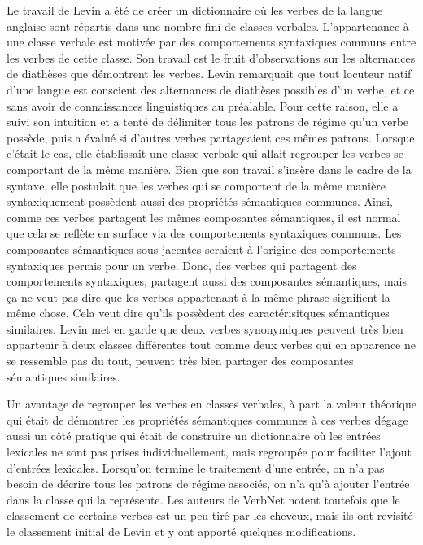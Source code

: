 Le travail de Levin\citep{verb-classes.levin.1993} a été de créer un dictionnaire où les verbes de la langue anglaise sont répartis dans une nombre fini de classes verbales. L'appartenance à une classe verbale est motivée par des comportements syntaxiques communs entre les verbes de cette classe. Son travail est le fruit d'observations sur les alternances de diathèses que démontrent les verbes. Levin remarquait que tout locuteur natif d'une langue est conscient des alternances de diathèses possibles d'un verbe, et ce sans avoir de connaissances linguistiques au préalable. Pour cette raison, elle a suivi son intuition et a tenté de délimiter tous les patrons de régime qu'un verbe possède, puis a évalué si d'autres verbes partageaient ces mêmes patrons. Lorsque c'était le cas, elle établissait une classe verbale qui allait regrouper les verbes se comportant de la même manière. Bien que son travail s'insère dans le cadre de la syntaxe, elle postulait que les verbes qui se comportent de la même manière syntaxiquement possèdent aussi des propriétés sémantiques communes. Ainsi, comme ces verbes partagent les mêmes composantes sémantiques, il est normal que cela se reflète en surface via des comportements syntaxiques communs. Les composantes sémantiques sous-jacentes seraient à l'origine des comportements syntaxiques permis pour un verbe. Donc, des verbes qui partagent des comportements syntaxiques, partagent aussi des composantes sémantiques, mais ça ne veut pas dire que les verbes appartenant à la même phrase signifient la même chose. Cela veut dire qu'ils possèdent des caractérisitques sémantiques similaires. Levin met en garde que deux verbes synonymiques peuvent très bien appartenir à deux classes différentes tout comme deux verbes qui en apparence ne se ressemble pas du tout, peuvent très bien partager des composantes sémantiques similaires.

Un avantage de regrouper les verbes en classes verbales, à part la valeur théorique qui était de démontrer les propriétés sémantiques communes à ces verbes  dégage aussi un côté pratique qui était de construire un dictionnaire où les entrées lexicales ne sont pas prises individuellement, mais regroupée pour faciliter l'ajout d'entrées lexicales. Lorsqu'on termine le traitement d'une entrée, on n'a pas besoin de décrire tous les patrons de régime associés, on n'a qu'à ajouter l'entrée dans la classe qui la représente. Les auteurs de VerbNet notent toutefois que le classement de certains verbes est un peu tiré par les cheveux, mais ils ont revisité le classement initial de Levin et y ont apporté quelques modifications\citep{SchulerVerbnetBroadcoverageComprehensive2005}. 


